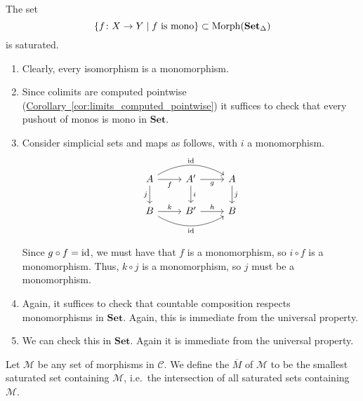 \documentclass[main.tex]{subfiles}
\begin{document}
\begin{example}
  \label{eg:monomorphisms_are_saturated}
  The set
  \begin{equation*}
    \{f\colon X \to Y \mid f \text{ is mono}\} \subset \mathrm{Morph}(\operatorname{\mathbf{Set}_{\Delta}})
  \end{equation*}
  is saturated.
  \begin{enumerate}
    \item Clearly, every isomorphism is a monomorphism.

    \item Since colimits are computed pointwise (\hyperref[cor:limits_computed_pointwise]{Corollary~\ref*{cor:limits_computed_pointwise}}) it suffices to check that every pushout of monos is mono in $\mathbf{Set}$.

    \item Consider simplicial sets and maps as follows, with $i$ a monomorphism.
      \begin{equation*}
        \begin{tikzcd}
          A
          \arrow[r, swap, "f"]
          \arrow[rr, bend left, "\id"]
          \arrow[d, swap, "j"]
          & A'
          \arrow[r, swap, "g"]
          \arrow[d, "i"]
          & A
          \arrow[d, "j"]
          \\
          B
          \arrow[rr, bend right, swap, "\id"]
          \arrow[r, "k"]
          & B'
          \arrow[r, "h"]
          & B
        \end{tikzcd}
      \end{equation*}

      Since $g \circ f = \mathrm{id}$, we must have that $f$ is a monomorphism, so $i \circ f$ is a monomorphism. Thus, $k \circ j$ is a monomorphism, so $j$ must be a monomorphism.

    \item Again, it suffices to check that countable composition respects monomorphisms in $\mathbf{Set}$. Again, this is immediate from the universal property.

    \item We can check this in $\mathbf{Set}$. Again it is immediate from the universal property.
  \end{enumerate}
\end{example}

\begin{definition}
  \label{def:saturated_hull}
  Let $\mathcal{M}$ be any set of morphisms in $\mathcal{C}$. We define the  $\overline{M}$ of $\mathcal{M}$ to be the smallest saturated set containing $\mathcal{M}$, i.e.\ the intersection of all saturated sets containing $\mathcal{M}$.
\end{definition}
\end{document}
